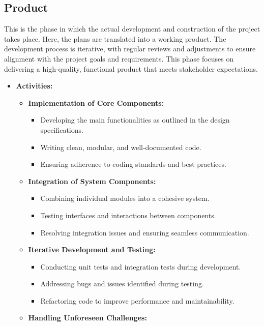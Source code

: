 \documentclass{article}
\begin{document}
\subsection{Product}
This is the phase in which the actual development and construction of the project takes place. Here, the plans are translated into a working product. The development process is iterative, with regular reviews and adjustments to ensure alignment with the project goals and requirements. This phase focuses on delivering a high-quality, functional product that meets stakeholder expectations.

\begin{itemize}[leftmargin=*, label={}]
    \item \textbf{Activities:}
    \begin{itemize}
        \item \textbf{Implementation of Core Components:}
        \begin{itemize}
            \item Developing the main functionalities as outlined in the design specifications.
            \item Writing clean, modular, and well-documented code.
            \item Ensuring adherence to coding standards and best practices.
        \end{itemize}
        \item \textbf{Integration of System Components:}
        \begin{itemize}
            \item Combining individual modules into a cohesive system.
            \item Testing interfaces and interactions between components.
            \item Resolving integration issues and ensuring seamless communication.
        \end{itemize}
        \item \textbf{Iterative Development and Testing:}
        \begin{itemize}
            \item Conducting unit tests and integration tests during development.
            \item Addressing bugs and issues identified during testing.
            \item Refactoring code to improve performance and maintainability.
        \end{itemize}
        \item \textbf{Handling Unforeseen Challenges:}

\end{itemize}
\end{itemize}
\end{document}

